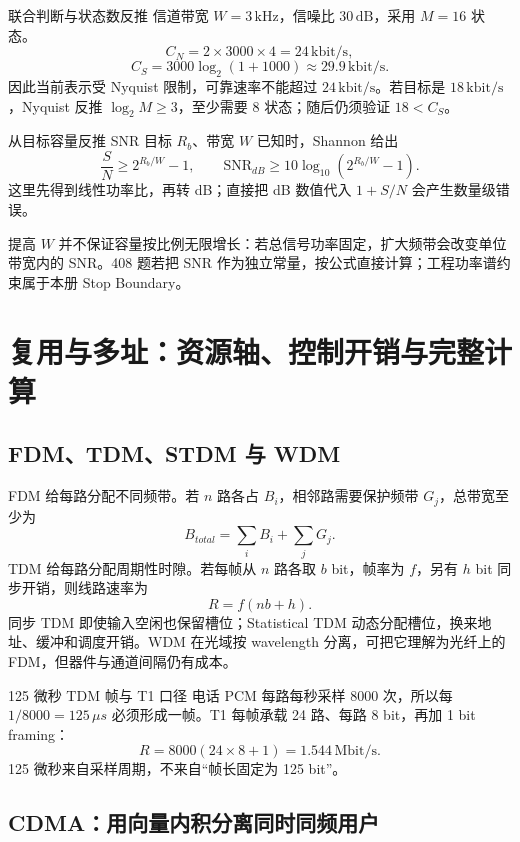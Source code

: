 \documentclass[UTF8,fontset=none,11pt,a4paper]{ctexart}
\begin{document}
\begin{examplebox}{联合判断与状态数反推}
信道带宽 \(W=3\,\mathrm{kHz}\)，信噪比 \(30\,\mathrm{dB}\)，采用 \(M=16\) 状态。
\[
C_N=2\times3000\times4=24\,\mathrm{kbit/s},
\]
\[
C_S=3000\log_2(1+1000)\approx29.9\,\mathrm{kbit/s}.
\]
因此当前表示受 Nyquist 限制，可靠速率不能超过 \(24\,\mathrm{kbit/s}\)。若目标是 \(18\,\mathrm{kbit/s}\)，Nyquist 反推
\(\log_2M\ge 3\)，至少需要 8 状态；随后仍须验证 \(18<C_S\)。
\end{examplebox}

\begin{examplebox}{从目标容量反推 SNR}
目标 \(R_b\)、带宽 \(W\) 已知时，Shannon 给出
\[
\frac SN\ge 2^{R_b/W}-1,
\qquad
\mathrm{SNR}_{dB}\ge10\log_{10}(2^{R_b/W}-1).
\]
这里先得到线性功率比，再转 dB；直接把 dB 数值代入 \(1+S/N\) 会产生数量级错误。
\end{examplebox}

提高 \(W\) 并不保证容量按比例无限增长：若总信号功率固定，扩大频带会改变单位带宽内的 SNR。408 题若把 SNR 作为独立常量，按公式直接计算；工程功率谱约束属于本册 Stop Boundary。

\section{复用与多址：资源轴、控制开销与完整计算}

\subsection{FDM、TDM、STDM 与 WDM}

FDM 给每路分配不同频带。若 \(n\) 路各占 \(B_i\)，相邻路需要保护频带 \(G_j\)，总带宽至少为
\[
B_{total}=\sum_i B_i+\sum_jG_j.
\]
TDM 给每路分配周期性时隙。若每帧从 \(n\) 路各取 \(b\) bit，帧率为 \(f\)，另有 \(h\) bit 同步开销，则线路速率为
\[
R=f(nb+h).
\]
同步 TDM 即使输入空闲也保留槽位；Statistical TDM 动态分配槽位，换来地址、缓冲和调度开销。WDM 在光域按 wavelength 分离，可把它理解为光纤上的 FDM，但器件与通道间隔仍有成本。

\begin{examplebox}{125 微秒 TDM 帧与 T1 口径}
电话 PCM 每路每秒采样 8000 次，所以每 \(1/8000=125\,\mu s\) 必须形成一帧。T1 每帧承载 24 路、每路 8 bit，再加 1 bit framing：
\[
R=8000(24\times8+1)=1.544\,\mathrm{Mbit/s}.
\]
125 微秒来自采样周期，不来自“帧长固定为 125 bit”。
\end{examplebox}

\subsection{CDMA：用向量内积分离同时同频用户}
\end{document}
